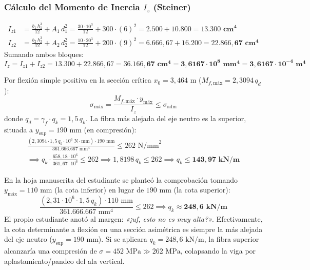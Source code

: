 \subsubsection*{Cálculo del Momento de Inercia $I_z$ (Steiner)}
\begin{align}
    I_{z1} & = \frac{b_1 \, h_1^3}{12} + A_1 \, d_1^2 = \frac{30 \cdot 10^3}{12} + 300 \cdot (6)^2 = 2.500 + 10.800 = \mathbf{13.300\text{ cm}^4} \\[6pt]
    I_{z2} & = \frac{b_2 \, h_2^3}{12} + A_2 \, d_2^2 = \frac{10 \cdot 20^3}{12} + 200 \cdot (9)^2 = 6.666{,}67 + 16.200 = \mathbf{22.866{,}67\text{ cm}^4}
\end{align}
Sumando ambos bloques:
\begin{equation}
    \boxed{I_z = I_{z1} + I_{z2} = 13.300 + 22.866{,}67 = \mathbf{36.166{,}67\text{ cm}^4 = 3{,}6167 \cdot 10^8\text{ mm}^4 = 3{,}6167 \cdot 10^{-4}\text{ m}^4}}
\end{equation}


Por flexión simple positiva en la sección crítica $x_0 = 3{,}464\text{ m}$ ($M_{f,\text{máx}} = 2{,}3094\,q_d$):
\begin{equation}
    \sigma_{\text{máx}} = \frac{M_{f,\text{máx}} \cdot y_{\text{máx}}}{I_z} \le \sigma_{\text{adm}}
\end{equation}
donde $q_d = \gamma_f \cdot q_k = 1{,}5\,q_k$. La fibra más alejada del eje neutro es la superior, situada a $y_{\text{sup}} = 190\text{ mm}$ (en compresión):
\begin{align}
    \frac{(2{,}3094 \cdot 1{,}5\,q_k \cdot 10^6\text{ N}\cdot\text{mm}) \cdot 190\text{ mm}}{361.666.667\text{ mm}^4} \le 262\text{ N/mm}^2 \nonumber \\
    \implies q_k \cdot \frac{658{,}18 \cdot 10^6}{361{,}67 \cdot 10^6} \le 262 \implies 1{,}8198\,q_k \le 262 \implies \boxed{q_k \le \mathbf{143{,}97\text{ kN/m}}}
\end{align}

\begin{tcolorbox}[colback=blue!5!white,colframe=blue!75!black,title=\textbf{Comparación con el Manuscrito: ¿Por qué figuraba $q_k = 248{,}6\text{ kN/m}$?}]
    En la hoja manuscrita del estudiante se planteó la comprobación tomando $y_{\text{máx}} = 110\text{ mm}$ (la cota inferior) en lugar de $190\text{ mm}$ (la cota superior):
    \[
        \frac{(2{,}31 \cdot 10^6 \cdot 1{,}5\,q_k) \cdot 110\text{ mm}}{361.666.667\text{ mm}^4} \le 262 \implies q_k \approx \mathbf{248{,}6\text{ kN/m}}
    \]
    El propio estudiante anotó al margen: \textit{«¡uf, esto no es muy alta?»}.
    Efectivamente, la cota determinante a flexión en una sección asimétrica es siempre la más alejada del eje neutro ($y_{\text{sup}} = 190\text{ mm}$). Si se aplicara $q_k = 248{,}6\text{ kN/m}$, la fibra superior alcanzaría una compresión de $\sigma = 452\text{ MPa} \gg 262\text{ MPa}$, colapsando la viga por aplastamiento/pandeo del ala vertical.
\end{tcolorbox}

